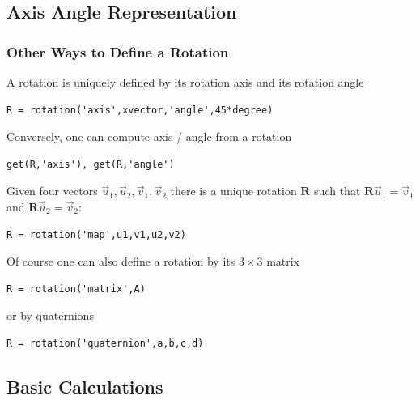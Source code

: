 \subsection*{Axis Angle Representation}
\label{sec:axis-angle-repr}

\begin{frame}[fragile]
  \frametitle{Other Ways to Define a Rotation}

  A rotation is uniquely defined by its rotation axis and its rotation angle

  \begin{lstlisting}
R = rotation('axis',xvector,'angle',45*degree)
  \end{lstlisting}

  \pause
  \medskip

  Conversely, one can compute axis / angle from a rotation

  \begin{lstlisting}
get(R,'axis'), get(R,'angle')
  \end{lstlisting}

  \pause
  \medskip

Given four vectors $\vec u_{1}, \vec u_{2}, \vec v_{1}, \vec v_{2}$ there is a
unique rotation $\mathbf R$ such that  $\mathbf R \vec u_{1} = \vec v_{1}$ and
$\mathbf R \vec u_{2} = \vec v_{2}$:

\begin{lstlisting}
R = rotation('map',u1,v1,u2,v2)
\end{lstlisting}

  \pause
  \medskip

Of course one can also define a rotation by its $3 \times 3$ matrix

  \begin{lstlisting}
R = rotation('matrix',A)
  \end{lstlisting}

or by quaternions

  \begin{lstlisting}
R = rotation('quaternion',a,b,c,d)
  \end{lstlisting}

\end{frame}


\subsection*{Basic Calculations}
\label{sec:euler-angles}

